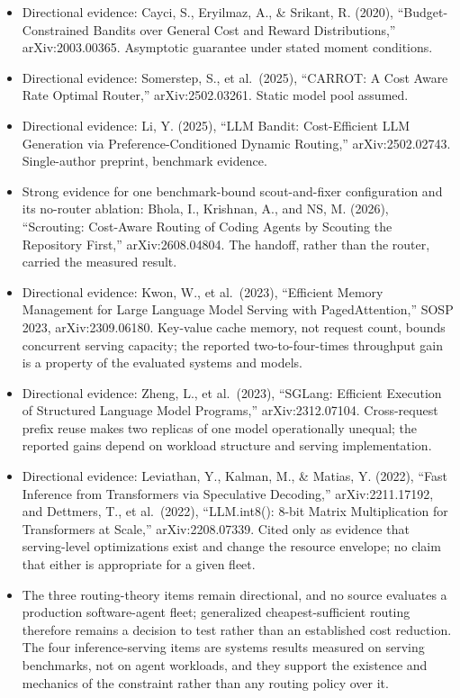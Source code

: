 \begin{itemize}
\tightlist
\item
  Directional evidence: Cayci, S., Eryilmaz, A., \& Srikant, R. (2020), ``Budget-Constrained Bandits over General Cost and Reward Distributions,'' arXiv:2003.00365. Asymptotic guarantee under stated moment conditions.
\item
  Directional evidence: Somerstep, S., et al.~(2025), ``CARROT: A Cost Aware Rate Optimal Router,'' arXiv:2502.03261. Static model pool assumed.
\item
  Directional evidence: Li, Y. (2025), ``LLM Bandit: Cost-Efficient LLM Generation via Preference-Conditioned Dynamic Routing,'' arXiv:2502.02743. Single-author preprint, benchmark evidence.
\item
  Strong evidence for one benchmark-bound scout-and-fixer configuration and its no-router ablation: Bhola, I., Krishnan, A., and NS, M. (2026), ``Scrouting: Cost-Aware Routing of Coding Agents by Scouting the Repository First,'' arXiv:2608.04804. The handoff, rather than the router, carried the measured result.
\item
  Directional evidence: Kwon, W., et al.~(2023), ``Efficient Memory Management for Large Language Model Serving with PagedAttention,'' SOSP 2023, arXiv:2309.06180. Key-value cache memory, not request count, bounds concurrent serving capacity; the reported two-to-four-times throughput gain is a property of the evaluated systems and models.
\item
  Directional evidence: Zheng, L., et al.~(2023), ``SGLang: Efficient Execution of Structured Language Model Programs,'' arXiv:2312.07104. Cross-request prefix reuse makes two replicas of one model operationally unequal; the reported gains depend on workload structure and serving implementation.
\item
  Directional evidence: Leviathan, Y., Kalman, M., \& Matias, Y. (2022), ``Fast Inference from Transformers via Speculative Decoding,'' arXiv:2211.17192, and Dettmers, T., et al.~(2022), ``LLM.int8(): 8-bit Matrix Multiplication for Transformers at Scale,'' arXiv:2208.07339. Cited only as evidence that serving-level optimizations exist and change the resource envelope; no claim that either is appropriate for a given fleet.
\item
  The three routing-theory items remain directional, and no source evaluates a production software-agent fleet; generalized cheapest-sufficient routing therefore remains a decision to test rather than an established cost reduction. The four inference-serving items are systems results measured on serving benchmarks, not on agent workloads, and they support the existence and mechanics of the constraint rather than any routing policy over it.

\end{itemize}
